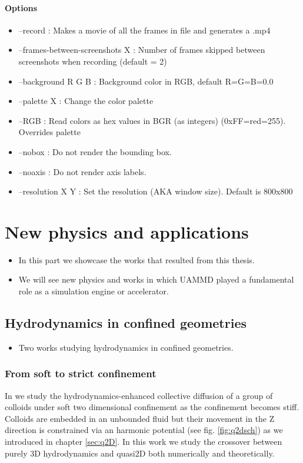 \documentclass[ twoside,openright,titlepage,numbers=noenddot,%
headinclude,footinclude,cleardoublepage=empty,abstract=on,
BCOR=5mm,paper=a4,fontsize=11pt, dvipsnames
]{scrreprt}
\newcommand{\uammd}{\gls{UAMMD}\xspace}
\begin{document}
\subsection*{Options}
\begin{itemize}
\item --record :  Makes a movie of all the frames in file and generates a .mp4
\item --frames-between-screenshots X : Number of frames skipped between screenshots when recording (default = 2)
\item --background R G B : Background color in RGB, default R=G=B=0.0
\item --palette X : Change the color palette
\item --RGB : Read colors as hex values in BGR (as integers) (0xFF=red=255). Overrides palette
\item --nobox : Do not render the bounding box.
\item --noaxis : Do not render axis labels.
\item --resolution X Y : Set the resolution (AKA window size). Default is 800x800          
\end{itemize}


\newpage
\cleardoublepage
\part{New physics and applications}\label{pt:applications}
\begin{itemize}
\item In this part we showcase the works that resulted from this thesis.
\item We will see new physics and works in which \uammd played a fundamental role as a simulation engine or accelerator.
\end{itemize}

\chapter{Hydrodynamics in confined geometries}
\begin{itemize}
\item Two works studying hydrodynamics in confined geometries.
\end{itemize}
\section{From soft to strict confinement}
 In \cite{Pelaez2017} we study the hydrodynamics-enhanced collective diffusion of a group of colloids under soft two dimensional confinement as the confinement becomes stiff. Colloids are embedded in an unbounded fluid but their movement in the Z direction is constrained via an harmonic potential (see fig. \ref{fig:q2dsch}) as we introduced in chapter \ref{sec:q2D}. In this work we study the crossover between purely 3D hydrodynamics and quasi2D both numerically and theoretically.
\end{document}
